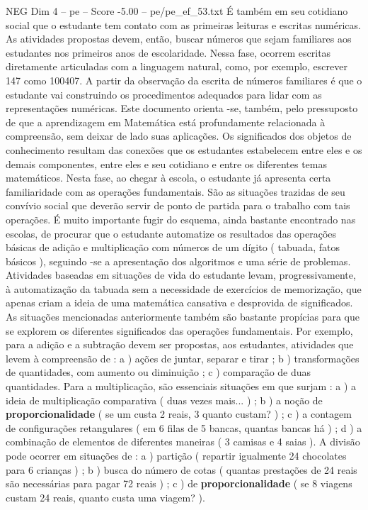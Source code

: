 \begin{textsample}{NEG Dim 4 – pe – Score -5.00 – pe/pe\_ef\_53.txt}
É também em seu cotidiano social que o estudante tem contato com as primeiras leituras e escritas numéricas.
As atividades propostas devem, então, buscar números que sejam familiares aos estudantes nos primeiros anos de escolaridade.
Nessa fase, ocorrem escritas diretamente articuladas com a linguagem natural, como, por exemplo, escrever 147 como 100407.
A partir da observação da escrita de números familiares é que o estudante vai construindo os procedimentos adequados para lidar com as representações numéricas.
Este documento orienta -se, também, pelo pressuposto de que a aprendizagem em Matemática está profundamente relacionada à compreensão, sem deixar de lado suas aplicações.
Os significados dos objetos de conhecimento resultam das conexões que os estudantes estabelecem entre eles e os demais componentes, entre eles e seu cotidiano e entre os diferentes temas matemáticos.
Nesta fase, ao chegar à escola, o estudante já apresenta certa familiaridade com as operações fundamentais.
São as situações trazidas de seu convívio social que deverão servir de ponto de partida para o trabalho com tais operações.
É muito importante fugir do esquema, ainda bastante encontrado nas escolas, de procurar que o estudante automatize os resultados das operações básicas de adição e multiplicação com números de um dígito ( tabuada, fatos básicos ), seguindo -se a apresentação dos algoritmos e uma série de problemas.
Atividades baseadas em situações de vida do estudante levam, progressivamente, à automatização da tabuada sem a necessidade de exercícios de memorização, que apenas criam a ideia de uma matemática cansativa e desprovida de significados.
As situações mencionadas anteriormente também são bastante propícias para que se explorem os diferentes significados das operações fundamentais.
Por exemplo, para a adição e a subtração devem ser propostas, aos estudantes, atividades que levem à compreensão de : a ) ações de juntar, separar e tirar ; b ) transformações de quantidades, com aumento ou diminuição ; c ) comparação de duas quantidades.
Para a multiplicação, são essenciais situações em que surjam : a ) a ideia de multiplicação comparativa ( duas vezes mais... ) ; b ) a noção de \textbf{proporcionalidade} ( se um custa 2 reais, 3 quanto custam? ) ; c ) a contagem de configurações retangulares ( em 6 filas de 5 bancas, quantas bancas há ) ; d ) a combinação de elementos de diferentes maneiras ( 3 camisas e 4 saias ).
A divisão pode ocorrer em situações de : a ) partição ( repartir igualmente 24 chocolates para 6 crianças ) ; b ) busca do número de cotas ( quantas prestações de 24 reais são necessárias para pagar 72 reais ) ; c ) de \textbf{proporcionalidade} ( se 8 viagens custam 24 reais, quanto custa uma viagem? ).

\end{textsample}
